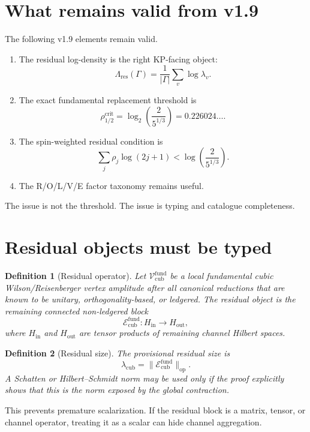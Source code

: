 \documentclass[11pt]{article}
\newtheorem{definition}{Definition}
\begin{document}
\section{What remains valid from v1.9}

The following v1.9 elements remain valid.

\begin{enumerate}[leftmargin=1.25cm]
  \item The residual log-density is the right KP-facing object:
  \[
    \Lambda_{\mathrm{res}}(\Gamma)=\frac{1}{|\Gamma|}\sum_v\log\lambda_v.
  \]
  \item The exact fundamental replacement threshold is
  \[
    \rho_{1/2}^{\mathrm{crit}}
    =\log_2\left(\frac{2}{5^{1/3}}\right)
    =0.226024\ldots.
  \]
  \item The spin-weighted residual condition is
  \[
    \sum_j \rho_j\log(2j+1)<\log\left(\frac{2}{5^{1/3}}\right).
  \]
  \item The R/O/L/V/E factor taxonomy remains useful.
\end{enumerate}

The issue is not the threshold. The issue is typing and catalogue completeness.

\section{Residual objects must be typed}

\begin{definition}[Residual operator]
Let $\mathcal V_{\mathrm{cub}}^{\mathrm{fund}}$ be a local fundamental cubic Wilson/Reisenberger vertex amplitude after all canonical reductions that are known to be unitary, orthogonality-based, or ledgered. The residual object is the remaining connected non-ledgered block
\[
  \mathcal E_{\mathrm{cub}}^{\mathrm{fund}}:H_{\mathrm{in}}\to H_{\mathrm{out}},
\]
where $H_{\mathrm{in}}$ and $H_{\mathrm{out}}$ are tensor products of remaining channel Hilbert spaces.
\end{definition}

\begin{definition}[Residual size]
The provisional residual size is
\[
  \lambda_{\mathrm{cub}}=\|\mathcal E_{\mathrm{cub}}^{\mathrm{fund}}\|_{\mathrm{op}}.
\]
A Schatten or Hilbert--Schmidt norm may be used only if the proof explicitly shows that this is the norm exposed by the global contraction.
\end{definition}

This prevents premature scalarization. If the residual block is a matrix, tensor, or channel operator, treating it as a scalar can hide channel aggregation.
\end{document}

